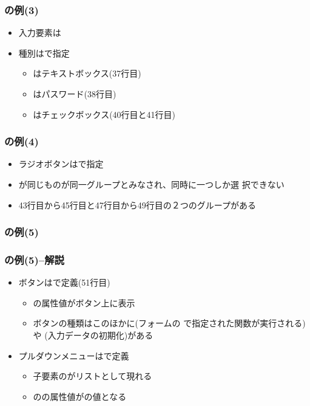 \begin{frame}[containsverbatim]
 \frametitle{の例(3)}\small
 \begin{itemize}
  \item 入力要素は
  \item 種別はで指定
        \begin{itemize}
         \item {}はテキストボックス(37行目)
         \item {}はパスワード(38行目)
         \item {}はチェックボックス(40行目と41行目)
        \end{itemize}
 \end{itemize}
\end{frame}
\begin{frame}[containsverbatim]
 \frametitle{の例(4)}{\footnotesize
 }
 \begin{itemize}
  \item ラジオボタンはで指定
  \item {}が同じものが同一グループとみなされ、同時に一つしか選
        択できない
  \item 43行目から45行目と47行目から49行目の２つのグループがある
 \end{itemize}
\end{frame}
\begin{frame}[containsverbatim]
 \frametitle{の例(5)}\small
 \end{frame}
\begin{frame}[containsverbatim]
 \frametitle{の例(5)--解説}
 \begin{itemize}
  \item ボタンはで定義(51行目)
        \begin{itemize}
         \item {}の属性値がボタン上に表示
         \item ボタンの種類はこのほかに(フォームの
               で指定された関数が実行される)や
               (入力データの初期化)がある
        \end{itemize}
  \item プルダウンメニューはで定義
    \begin{itemize}
     \item 子要素のがリストとして現れる
     \item {}のの属性値がの値となる
    \end{itemize}
 \end{itemize}
\end{frame}
